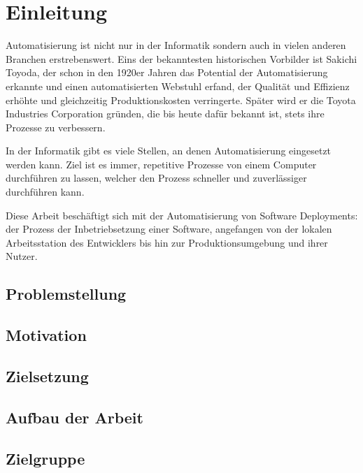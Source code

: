
\chapter{Einleitung}

Automatisierung ist nicht nur in der Informatik sondern auch in vielen anderen Branchen erstrebenswert. Eins der bekanntesten historischen Vorbilder ist Sakichi Toyoda, der schon in den 1920er Jahren das Potential der Automatisierung erkannte und einen automatisierten Webstuhl erfand, der Qualität und Effizienz erhöhte und gleichzeitig Produktionskosten verringerte. Später wird er die Toyota Industries Corporation gründen, die bis heute dafür bekannt ist, stets ihre Prozesse zu verbessern.

In der Informatik gibt es viele Stellen, an denen Automatisierung eingesetzt werden kann. Ziel ist es immer, repetitive Prozesse von einem Computer durchführen zu lassen, welcher den Prozess schneller und zuverlässiger durchführen kann.

Diese Arbeit beschäftigt sich mit der Automatisierung von Software Deployments: der Prozess der Inbetriebsetzung einer Software, angefangen von der lokalen Arbeitsstation des Entwicklers bis hin zur Produktionsumgebung und ihrer Nutzer.


\section{Problemstellung}


\section{Motivation}


\section{Zielsetzung}


\section{Aufbau der Arbeit}


\section{Zielgruppe}
